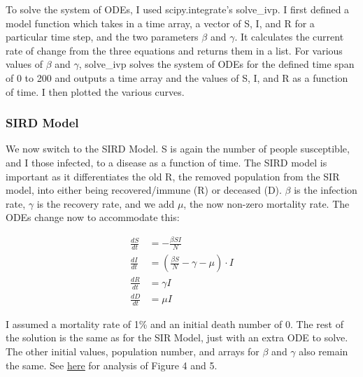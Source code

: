 \documentclass[12pt]{article}
\begin{document}
To solve the system of ODEs, I used scipy.integrate's solve\_ivp. I first defined a model function which takes in a time array, a vector of S, I, and R for a particular time step, and the two parameters $\beta$ and $\gamma$. It calculates the current rate of change from the three equations and returns them in a list. For various values of $\beta$ and $\gamma$, solve\_ivp solves the system of ODEs for the defined time span of 0 to 200 and outputs a time array and the values of S, I, and R as a function of time. I then plotted the various curves.

\subsubsection{SIRD Model}

We now switch to the SIRD Model. S is again the number of people susceptible, and I those infected, to a disease as a function of time. The SIRD model is important as it differentiates the old R, the removed population from the SIR model, into either being recovered/immune (R) or deceased (D). $\beta$ is the infection rate, $\gamma$ is the recovery rate, and we add $\mu$, the now non-zero mortality rate. The ODEs change now to accommodate this: 

\begin{align}
    \frac{dS}{dt} &= - \frac{\beta S I}{N} \\
    \frac{dI}{dt} &= \left(\frac{\beta S}{N} - \gamma - \mu\right) \cdot I \\
    \frac{dR}{dt} &= \gamma I \\
    \frac{dD}{dt} &= \mu I
\end{align}

I assumed a mortality rate of 1\% and an initial death number of 0. The rest of the solution is the same as for the SIR Model, just with an extra ODE to solve. The other initial values, population number, and arrays for $\beta$ and $\gamma$ also remain the same. See \hyperref[subsec:AnalysisQ2]{\color{blue}\uline{here}} for analysis of Figure 4 and 5.
\end{document}

